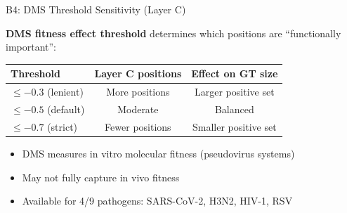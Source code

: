 \documentclass[aspectratio=169,11pt]{beamer}
\begin{document}
\begin{frame}{B4: DMS Threshold Sensitivity (Layer C)}

\textbf{DMS fitness effect threshold} determines which positions are ``functionally important'':

\vspace{1em}
\begin{center}
\begin{tabular}{lcc}
\toprule
\textbf{Threshold} & \textbf{Layer C positions} & \textbf{Effect on GT size} \\
\midrule
$\leq -0.3$ (lenient) & More positions & Larger positive set \\
\rowcolor{stage1blue!8}
$\leq -0.5$ (default) & Moderate & Balanced \\
$\leq -0.7$ (strict) & Fewer positions & Smaller positive set \\
\bottomrule
\end{tabular}
\end{center}

\vspace{1em}
\begin{itemize}
  \item DMS measures in vitro molecular fitness (pseudovirus systems)
  \item May not fully capture in vivo fitness
  \item Available for 4/9 pathogens: SARS-CoV-2, H3N2, HIV-1, RSV
\end{itemize}
\end{frame}
\end{document}

